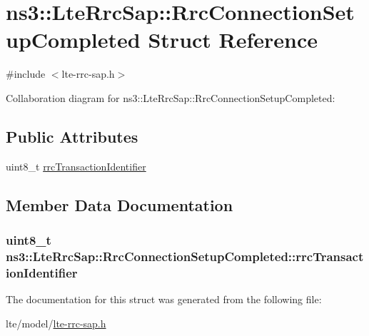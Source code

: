 \hypertarget{structns3_1_1LteRrcSap_1_1RrcConnectionSetupCompleted}{}\section{ns3\+:\+:Lte\+Rrc\+Sap\+:\+:Rrc\+Connection\+Setup\+Completed Struct Reference}
\label{structns3_1_1LteRrcSap_1_1RrcConnectionSetupCompleted}


{\ttfamily \#include $<$lte-\/rrc-\/sap.\+h$>$}



Collaboration diagram for ns3\+:\+:Lte\+Rrc\+Sap\+:\+:Rrc\+Connection\+Setup\+Completed\+:
\subsection*{Public Attributes}
\begin{DoxyCompactItemize}
\item 
uint8\+\_\+t \hyperlink{structns3_1_1LteRrcSap_1_1RrcConnectionSetupCompleted_a35e8f1ef1d17066400805eb2d803db1e}{rrc\+Transaction\+Identifier}
\end{DoxyCompactItemize}


\subsection{Member Data Documentation}
\subsubsection[{\texorpdfstring{rrc\+Transaction\+Identifier}{rrcTransactionIdentifier}}]{\setlength{\rightskip}{0pt plus 5cm}uint8\+\_\+t ns3\+::\+Lte\+Rrc\+Sap\+::\+Rrc\+Connection\+Setup\+Completed\+::rrc\+Transaction\+Identifier}\hypertarget{structns3_1_1LteRrcSap_1_1RrcConnectionSetupCompleted_a35e8f1ef1d17066400805eb2d803db1e}{}\label{structns3_1_1LteRrcSap_1_1RrcConnectionSetupCompleted_a35e8f1ef1d17066400805eb2d803db1e}


The documentation for this struct was generated from the following file\+:\begin{DoxyCompactItemize}
\item 
lte/model/\hyperlink{lte-rrc-sap_8h}{lte-\/rrc-\/sap.\+h}\end{DoxyCompactItemize}
